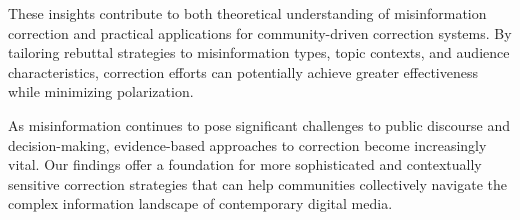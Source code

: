 \documentclass[twocolumn]{article}
\begin{document}
These insights contribute to both theoretical understanding of misinformation correction and practical applications for community-driven correction systems. By tailoring rebuttal strategies to misinformation types, topic contexts, and audience characteristics, correction efforts can potentially achieve greater effectiveness while minimizing polarization.

As misinformation continues to pose significant challenges to public discourse and decision-making, evidence-based approaches to correction become increasingly vital. Our findings offer a foundation for more sophisticated and contextually sensitive correction strategies that can help communities collectively navigate the complex information landscape of contemporary digital media.
\end{document}
